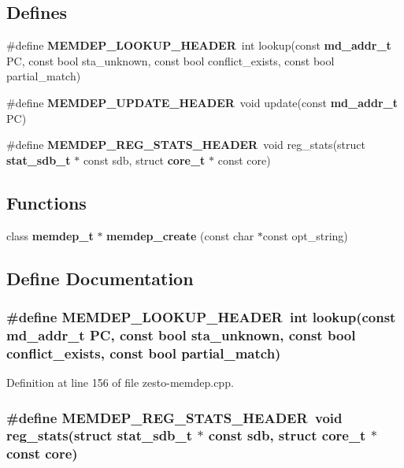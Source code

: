 \subsection*{Defines}
\begin{CompactItemize}
\item 
\#define {\bf MEMDEP\_\-LOOKUP\_\-HEADER}~int lookup(const {\bf md\_\-addr\_\-t} PC, const bool sta\_\-unknown, const bool conflict\_\-exists, const bool partial\_\-match)
\item 
\#define {\bf MEMDEP\_\-UPDATE\_\-HEADER}~void update(const {\bf md\_\-addr\_\-t} PC)
\item 
\#define {\bf MEMDEP\_\-REG\_\-STATS\_\-HEADER}~void reg\_\-stats(struct {\bf stat\_\-sdb\_\-t} $\ast$ const sdb, struct {\bf core\_\-t} $\ast$ const core)
\end{CompactItemize}
\subsection*{Functions}
\begin{CompactItemize}
\item 
class {\bf memdep\_\-t} $\ast$ {\bf memdep\_\-create} (const char $\ast$const opt\_\-string)
\end{CompactItemize}


\subsection{Define Documentation}
\subsubsection[{MEMDEP\_\-LOOKUP\_\-HEADER}]{\setlength{\rightskip}{0pt plus 5cm}\#define MEMDEP\_\-LOOKUP\_\-HEADER~int lookup(const {\bf md\_\-addr\_\-t} PC, const bool sta\_\-unknown, const bool conflict\_\-exists, const bool partial\_\-match)}\label{zesto-memdep_8cpp_846e33f88be6e78e567ed39b7f8d61c8}




Definition at line 156 of file zesto-memdep.cpp.
\subsubsection[{MEMDEP\_\-REG\_\-STATS\_\-HEADER}]{\setlength{\rightskip}{0pt plus 5cm}\#define MEMDEP\_\-REG\_\-STATS\_\-HEADER~void reg\_\-stats(struct {\bf stat\_\-sdb\_\-t} $\ast$ const sdb, struct {\bf core\_\-t} $\ast$ const core)}\label{zesto-memdep_8cpp_ba472a4ae4d59fa1f92e3bf8dc882ac8}




